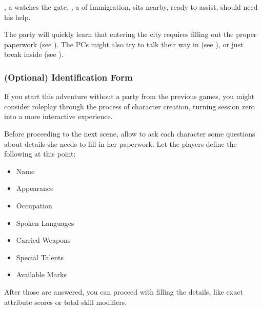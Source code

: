 
\npcHauka[s]{}, a \enemyGuardC{} watches the gate. \npcNissiqqan[s]{}, a \enemyScribeB{} of Immigration, sits nearby, ready to assist, should \npcHauka{} need his help.

The party will quickly learn that entering the city requires filling out the proper paperwork (see ). The PCs might also try to talk their way in (see ), or just break inside (see ).



\subsubsection{(Optional) Identification Form}

If you start this adventure without a party from the previous games, you might consider roleplay through the process of character creation, turning session zero into a more interactive experience.

Before proceeding to the next scene, allow \npcHauka{} to ask each character some questions about details she needs to fill in her paperwork. Let the players define the following at this point:

\begin{itemize}
	\item Name
	\item Appearance
	\item Occupation
	\item Spoken Languages
	\item Carried Weapons
	\item Special Talents
	\item Available Marks
\end{itemize}

After those are answered, you can proceed with filling the details, like exact attribute scores or total skill modifiers.





